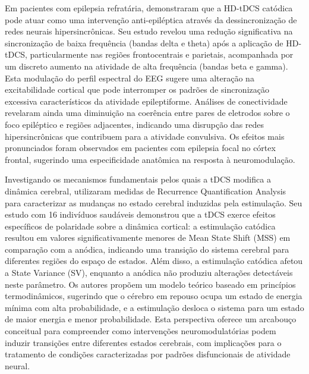 Em pacientes com epilepsia refratária,  demonstraram que a HD-tDCS catódica pode atuar como uma intervenção anti-epiléptica através da dessincronização de redes neurais hipersincrônicas. Seu estudo revelou uma redução significativa na sincronização de baixa frequência (bandas delta e theta) após a aplicação de HD-tDCS, particularmente nas regiões frontocentrais e parietais, acompanhada por um discreto aumento na atividade de alta frequência (bandas beta e gamma). Esta modulação do perfil espectral do EEG sugere uma alteração na excitabilidade cortical que pode interromper os padrões de sincronização excessiva característicos da atividade epileptiforme. Análises de conectividade revelaram ainda uma diminuição na coerência entre pares de eletrodos sobre o foco epiléptico e regiões adjacentes, indicando uma disrupção das redes hipersincrônicas que contribuem para a atividade convulsiva. Os efeitos mais pronunciados foram observados em pacientes com epilepsia focal no córtex frontal, sugerindo uma especificidade anatômica na resposta à neuromodulação.

Investigando os mecanismos fundamentais pelos quais a tDCS modifica a dinâmica cerebral,  utilizaram medidas de Recurrence Quantification Analysis para caracterizar as mudanças no estado cerebral induzidas pela estimulação. Seu estudo com 16 indivíduos saudáveis demonstrou que a tDCS exerce efeitos específicos de polaridade sobre a dinâmica cortical: a estimulação catódica resultou em valores significativamente menores de Mean State Shift (MSS) em comparação com a anódica, indicando uma transição do sistema cerebral para diferentes regiões do espaço de estados. Além disso, a estimulação catódica afetou a State Variance (SV), enquanto a anódica não produziu alterações detectáveis neste parâmetro. Os autores propõem um modelo teórico baseado em princípios termodinâmicos, sugerindo que o cérebro em repouso ocupa um estado de energia mínima com alta probabilidade, e a estimulação desloca o sistema para um estado de maior energia e menor probabilidade. Esta perspectiva oferece um arcabouço conceitual para compreender como intervenções neuromodulatórias podem induzir transições entre diferentes estados cerebrais, com implicações para o tratamento de condições caracterizadas por padrões disfuncionais de atividade neural.

